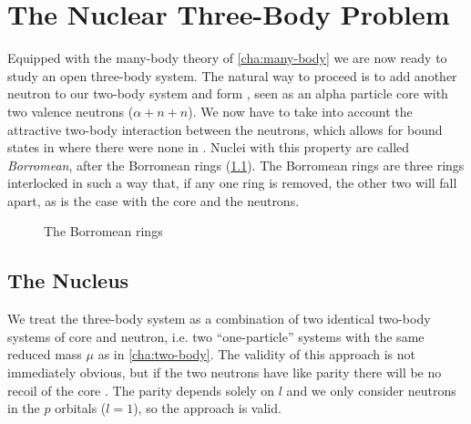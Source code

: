 \documentclass[../main/report.tex]{subfiles}
\begin{document}
\chapter{The Nuclear Three-Body Problem}
\label{cha:three-body}


Equipped with the many-body theory of \cref{cha:many-body} we are now ready to study an open three-body system.
The natural way to proceed is to add another neutron to our two-body  system and form , seen as an alpha particle core with two valence neutrons ($\alpha + n + n$).
We now have to take into account the attractive two-body interaction between the neutrons, which allows for bound states in  where there were none in .
Nuclei with this property are called \emph{Borromean}, after the Borromean rings (\cref{fig:borromean}). 
The Borromean rings are three rings interlocked in such a way that, if any one ring is removed, the other two will fall apart, as is the case with the core and the neutrons.

\begin{figure}[h]
  \newcommand{\circdist}{1.2}
  \newcommand{\circrad}{2}
  \centering
  \caption{The Borromean rings}
  \label{fig:borromean}
\end{figure}

\section{The  Nucleus}

We treat the three-body system as a combination of two identical two-body systems of core and neutron, i.e. two ``one-particle'' systems with the same reduced mass $\mu$ as in \cref{cha:two-body}.
The validity of this approach is not immediately obvious, but 
if the two neutrons have like parity there will be no recoil of the core \cite{suzuki}. 
The parity depends solely on $l$ and we only consider neutrons in the $p$ orbitals ($l=1$), so the approach is valid.
\end{document}
